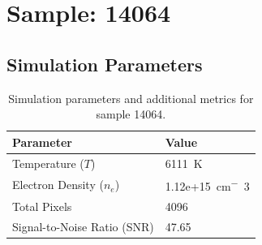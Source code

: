 \documentclass[a4paper,11pt]{article}
\begin{document}
\clearpage

\section{Sample: 14064}
\subsection{Simulation Parameters}
\begin{table}[h!]
    \centering
    \begin{tabular}{ll}
        \toprule
        \textbf{Parameter} & \textbf{Value} \\
        \midrule
        Temperature ($T$) & 6111 \,\si{K} \\
        Electron Density ($n_e$) & 1.12e+15 \,\si{cm^-3} \\
        Total Pixels & 4096 \\
        Signal-to-Noise Ratio (SNR) & 47.65 \\
        \bottomrule
    \end{tabular}
    \caption{Simulation parameters and additional metrics for sample 14064.}
    \label{tab:params_14064}
\end{table}
\end{document}

